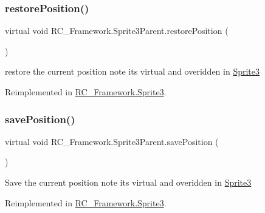 \subsubsection{\texorpdfstring{restore\+Position()}{restorePosition()}}
{\footnotesize\ttfamily virtual void R\+C\+\_\+\+Framework.\+Sprite3\+Parent.\+restore\+Position (\begin{DoxyParamCaption}{ }\end{DoxyParamCaption})\hspace{0.3cm}{\ttfamily [virtual]}}



restore the current position note its virtual and overidden in \mbox{\hyperlink{class_r_c___framework_1_1_sprite3}{Sprite3}} 



Reimplemented in \mbox{\hyperlink{class_r_c___framework_1_1_sprite3_a4ffc487d5c332dee276909dad3dba57a}{R\+C\+\_\+\+Framework.\+Sprite3}}.

\mbox{\label{class_r_c___framework_1_1_sprite3_parent_ad934c0f7664064c6ac89525bf06516fc}} 
\subsubsection{\texorpdfstring{save\+Position()}{savePosition()}}
{\footnotesize\ttfamily virtual void R\+C\+\_\+\+Framework.\+Sprite3\+Parent.\+save\+Position (\begin{DoxyParamCaption}{ }\end{DoxyParamCaption})\hspace{0.3cm}{\ttfamily [virtual]}}



Save the current position note its virtual and overidden in \mbox{\hyperlink{class_r_c___framework_1_1_sprite3}{Sprite3}} 



Reimplemented in \mbox{\hyperlink{class_r_c___framework_1_1_sprite3_ae4733340c18c8098b250418081020c6a}{R\+C\+\_\+\+Framework.\+Sprite3}}.

\mbox{\label{class_r_c___framework_1_1_sprite3_parent_aafe2f4e919b30044d02600942068d205}} 
